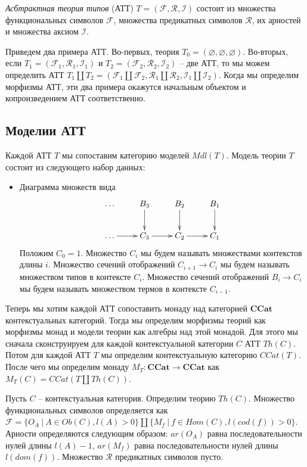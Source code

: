 \documentclass{amsart}
\theoremstyle{definition}
\theoremstyle{remark}
\newcommand{\cat}[1]{\mathbf{#1}}
\newcommand{\ccat}{\cat{CCat}}
\numberwithin{figure}{section}
\begin{document}
\begin{defn}
\emph{Асбтрактная теория типов} (АТТ) $T = (\mathcal{F}, \mathcal{R}, \mathcal{I})$ состоит из множества функциональных символов $\mathcal{F}$, множества предикатных символов $\mathcal{R}$, их арностей и множества аксиом $\mathcal{I}$.
\end{defn}

Приведем два примера АТТ.
Во-первых, теория $T_0 = (\varnothing, \varnothing, \varnothing)$.
Во-вторых, если $T_1 = (\mathcal{F}_1, \mathcal{R}_1, \mathcal{I}_1)$ и $T_2 = (\mathcal{F}_2, \mathcal{R}_2, \mathcal{I}_2)$ -- две АТТ,
то мы можем определить АТТ $T_1 \amalg T_2 = (\mathcal{F}_1 \amalg \mathcal{F}_2, \mathcal{R}_1 \amalg \mathcal{R}_2, \mathcal{I}_1 \amalg \mathcal{I}_2)$.
Когда мы определим морфизмы АТТ, эти два примера окажутся начальным объектом и копроизведением АТТ соответственно.

\subsection{Моделии АТТ}

Каждой АТТ $T$ мы сопоставим категорию моделей $Mdl(T)$.
Модель теории $T$ состоит из следующего набор данных:
\begin{itemize}
\item Диаграмма множеств вида
\[ \xymatrix{ \ldots        & B_3 \ar[d] & B_2 \ar[d] & B_1 \ar[d] \\
              \ldots \ar[r] & C_3 \ar[r] & C_2 \ar[r] & C_1
            } \]
Положим $C_0 = 1$.
Множество $C_i$ мы будем называть множествами контекстов длины $i$.
Множество сечений отображений $C_{i+1} \to C_i$ мы будем называть множеством типов в контексте $C_i$.
Множество сечений отображений $B_i \to C_i$ мы будем называть множеством термов в контексте $C_{i-1}$.
\end{itemize}

Теперь мы хотим каждой АТТ сопоставить монаду над категорией $\ccat$ контекстуальных категорий.
Тогда мы определим морфизмы теорий как морфизмы монад и модели теории как алгебры над этой монадой.
Для этого мы сначала сконструируем для каждой контекстуальной категории $C$ АТТ $Th(C)$.
Потом для каждой АТТ $T$ мы определим контекстуальную категорию $CCat(T)$.
После чего мы определим монаду $M_T : \ccat \to \ccat$ как $M_T(C) = CCat(T \amalg Th(C))$.

Пусть $C$ -- контекстуальная категория.
Определим теорию $Th(C)$.
Множество функциональных символов определяется как $\mathcal{F} = \{ O_A\ |\ A \in Ob(C), l(A) > 0 \} \amalg \{ M_f\ |\ f \in Hom(C), l(cod(f)) > 0 \}$.
Арности определяются следующим образом: $ar(O_A)$ равна последовательности нулей длины $l(A) - 1$, $ar(M_f)$ равна последовательности нулей длины $l(dom(f))$.
Множество $\mathcal{R}$ предикатных символов пусто.
\end{document}
